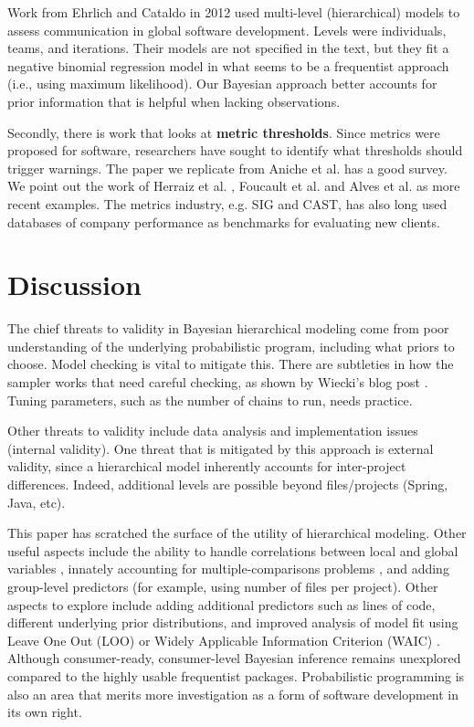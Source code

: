 \documentclass[sigconf,natbib=false]{acmart}
\begin{document}
Work from Ehrlich and Cataldo \cite{Ehrlich:2012} in 2012 used multi-level (hierarchical) models to assess communication in global software development. Levels were individuals, teams, and iterations. Their models are not specified in the text, but they fit a negative binomial regression model in what seems to be a frequentist approach (i.e., using maximum likelihood). Our Bayesian approach better accounts for prior information that is helpful when lacking observations.

Secondly, there is work that looks at \textbf{metric thresholds}. Since metrics were proposed for software, researchers have sought to identify what thresholds should trigger warnings. The paper we replicate from Aniche et al. \cite{Aniche2016} has a good survey. We point out the work of Herraiz et al. \cite{Herraiz2012}, Foucault et al. \cite{Foucault2014} and Alves et al. \cite{alves2010deriving} as more recent examples. The metrics industry, e.g. SIG and CAST, has also long used databases of company performance as benchmarks for evaluating new clients.


\section{Discussion}
The chief threats to validity in Bayesian hierarchical modeling come from poor understanding of the underlying probabilistic program, including what priors to choose. Model checking is vital to mitigate this. There are subtleties in how the sampler works that need careful checking, as shown by Wiecki's blog post \cite{Wiecki17}. Tuning parameters, such as the number of chains to run, needs practice. 

Other threats to validity include data analysis and implementation issues (internal validity). One threat that is mitigated by this approach is external validity, since a hierarchical model inherently accounts for inter-project differences. Indeed, additional levels are possible beyond files/projects (Spring, Java, etc).

This paper has scratched the surface of the utility of hierarchical modeling. Other useful aspects include the ability to handle correlations between local and global variables \cite{mcilreath16}, innately accounting for multiple-comparisons problems \cite{Gelman:2012aa}, and adding group-level predictors (for example, using number of files per project). Other aspects to explore include adding additional predictors such as lines of code, different underlying prior distributions, and improved analysis of model fit using Leave One Out (LOO) or Widely Applicable Information Criterion (WAIC) \cite{vehtari15}. Although consumer-ready, consumer-level Bayesian inference remains unexplored compared to the highly usable frequentist packages. Probabilistic programming is also an area that merits more investigation as a form of software development in its own right.
\end{document}
